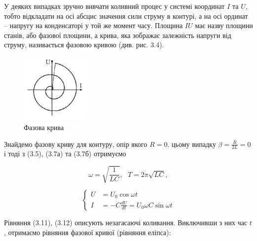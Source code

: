 \documentclass[12pt,a4paper]{article}
\begin{document}
    У деяких випадках зручно вивчати коливний процес у системі координат $I$ та $U$,
    тобто відкладати на осі абсцис значення сили струму в контурі,
    а на осі ординат -- напругу на конденсаторі у той же момент часу.
    Площина $IU$ має назву площини станів, або фазової площини, а крива,
    яка зображає залежність напруги від струму, називається фазовою кривою (див. рис. 3.4).

    \begin{figure}[h!]

        \renewcommand{\thefigure}{3.\arabic{figure}} %

        \centering
        \includegraphics[width=0.3\textwidth]{3.4.png}
        \caption{Фазова крива}
        \label{fig4:schema}

    \end{figure}

    Знайдемо фазову криву для контуру, опір якого $R = 0$. цьому випадку
    $\beta = \frac{R}{2L} = 0$ і тоді з (3.5), (3.7а) та (3.7б) отримуємо

    \begin{equation}
        \omega = \sqrt{\frac{1}{LC}},\text{ } T = 2\pi \sqrt{LC},
        \tag{3.11}
    \end{equation}

    \begin{equation}
        \left\{
        \begin{aligned}
            U &= U_0 \cos \omega t \\
            I &= -C \frac{dU}{dt} = U_0 \omega C \sin \omega t
        \end{aligned}
        \right.
        \tag{3.12}
    \end{equation}

    Рівняння (3.11), (3.12) описують незагасаючі коливання.
    Виключивши з них час $t$, отримаємо рівняння фазової кривої (рівняння еліпса):
\end{document}
